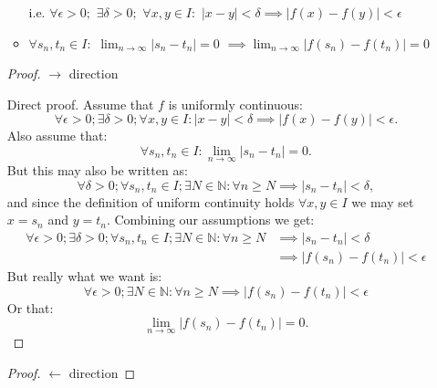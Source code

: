 \begin{enumerate}
\begin{itemize}
        i.e. $\forall\epsilon>0;$ $\exists\delta>0;$
        $\forall x, y \in I:$
        $|x-y|<\delta \implies |f(x)-f(y)|<\epsilon$

        \item $\forall s_n, t_n \in I:$
        $\displaystyle\lim_{n\rightarrow\infty}|s_n - t_n|=0$
        $\implies\displaystyle\lim_{n\rightarrow\infty}|f(s_n) - f(t_n)|=0$
    \end{itemize}
    \begin{proof}
        $\rightarrow$ direction
        
        Direct proof. Assume that $f$ is uniformly continuous:
        $$\forall\epsilon>0; \exists\delta>0; \forall x, y \in I: |x-y|<\delta
        \implies |f(x)-f(y)|<\epsilon.$$
        Also assume that:
        $$\forall s_n, t_n\in I: \lim_{n\rightarrow\infty}|s_n-t_n|=0.$$
        But this may also be written as:
        $$\forall\delta>0; \forall s_n, t_n\in I; \exists N\in\mathbb{N}: \forall n\geq N\implies |s_n - t_n|<\delta,$$
        and since the definition of uniform continuity holds $\forall x, y\in I$ we may set $x=s_n$ and $y=t_n$. Combining our assumptions we get:
        \begin{align*}
            \forall\epsilon>0; \exists\delta>0; \forall s_n, t_n\in I; \exists N\in\mathbb{N}: \forall n\geq N
            &\implies |s_n-t_n|<\delta \\
            &\implies |f(s_n)-f(t_n)|<\epsilon
        \end{align*}
        But really what we want is:
        $$\forall\epsilon>0; \exists N\in\mathbb{N}:
        \forall n\geq N\implies|f(s_n)-f(t_n)|<\epsilon$$
        Or that:
        $$\lim_{n\rightarrow\infty}|f(s_n)-f(t_n)|=0.$$
    \end{proof}

    \newpage
    
    \begin{proof}
        $\leftarrow$ direction


\end{proof}
\end{enumerate}
